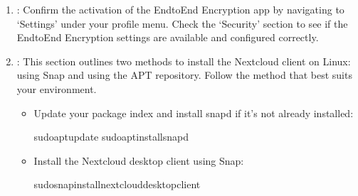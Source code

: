 \documentclass[letterpaper,10pt,english]{sphinxmanual}
\let\sphinxpxdimen\pdfpxdimen\else\newdimen\sphinxpxdimen
\begin{document}
\begin{enumerate}
\begin{itemize}
\end{itemize}

\sphinxAtStartPar
{}
\sphinxhyphen{} Ensure that your Nextcloud server is compatible with the version of the End\sphinxhyphen{}to\sphinxhyphen{}End Encryption app you intend to install. Compatibility details are usually listed on the app’s page within the Apps management interface.

\item {} 
\sphinxAtStartPar
{}:
\sphinxhyphen{} Confirm the activation of the End\sphinxhyphen{}to\sphinxhyphen{}End Encryption app by navigating to ‘Settings’ under your profile menu. Check the ‘Security’ section to see if the End\sphinxhyphen{}to\sphinxhyphen{}End Encryption settings are available and configured correctly.

\noindent{\hspace*{\fill}\sphinxincludegraphics[width=400\sphinxpxdimen]{{verify_e2ee}.png}\hspace*{\fill}}

\item {} 
\sphinxAtStartPar
{}:
This section outlines two methods to install the Nextcloud client on Linux: using Snap and using the APT repository. Follow the method that best suits your environment.

\sphinxAtStartPar
{}
\begin{itemize}
\item {} 
\sphinxAtStartPar
Update your package index and install snapd if it’s not already installed:

\begin{sphinxVerbatim}[commandchars=\\\{\}]
sudoaptupdate
sudoaptinstallsnapd
\end{sphinxVerbatim}

\item {} 
\sphinxAtStartPar
Install the Nextcloud desktop client using Snap:

\begin{sphinxVerbatim}[commandchars=\\\{\}]
sudosnapinstallnextcloud\PYGZhy{}desktop\PYGZhy{}client
\end{sphinxVerbatim}

\end{itemize}


\end{enumerate}
\end{document}
